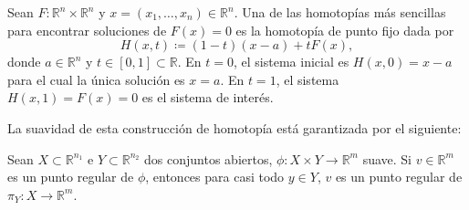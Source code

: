 \begin{frame}
	\begin{definition}
		Sean
		\begin{math}
			F\colon\mathbb{R}^{n}\times\mathbb{R}^{n}
		\end{math}
		y
		\begin{math}
			x=\left(x_{1},\dotsc,x_{n}\right)\in\mathbb{R}^{n}
		\end{math}.
		Una de las homotopías más sencillas para encontrar soluciones de
		$F\left(x\right)=0$ es la \alert{homotopía de punto fijo} dada
		por
		\begin{equation*}
			H\left(x,t\right)\coloneqq
			\left(1-t\right)\left(x-a\right)+tF\left(x\right),
		\end{equation*}
		donde $a\in\mathbb{R}^{n}$ y
		$t\in\left[0,1\right]\subset\mathbb{R}$.
		En $t=0$, el sistema inicial es $H\left(x,0\right)=x-a$
		para el cual la única solución es $x=a$.
		En $t=1$, el sistema $H\left(x,1\right)=F\left(x\right)=0$ es el
		sistema de interés.
	\end{definition}
	La suavidad de esta construcción de homotopía está garantizada por
	el siguiente:
	\begin{theorem}
		Sean $X\subset\mathbb{R}^{n_{1}}$ e $Y\subset\mathbb{R}^{n_{2}}$
		dos conjuntos abiertos, $\phi\colon X\times Y\to\mathbb{R}^{m}$
		suave.
		Si $v\in\mathbb{R}^{m}$ es un punto regular de $\phi$, entonces
		para casi todo $y\in Y$, $v$ es un punto regular de
		$\pi_{Y}\colon X\to\mathbb{R}^{m}$.
	\end{theorem}
\end{frame}

